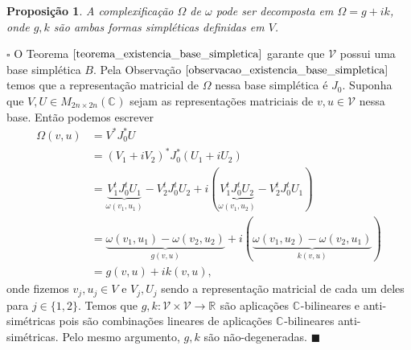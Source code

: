 \documentclass[12pt]{book}
\newtheorem{proposicao}[teorema]{Proposição}
\newenvironment{prova}[1]{$\square$ #1}{\hfill$\blacksquare$}
\newcommand{\complexificado}[1]{\mathcal{#1}}
\newcommand{\complexo}[1]{\mathbb{C}^{#1}}
\newcommand{\estruturacomplexa}{J_{0}}
\newcommand{\formaSimpletica}[2]{\omega(#1, #2)}
\newcommand{\formaSimpleticaExtendida}[2]{\Omega(#1, #2)}
\newcommand{\matrizquadcomplexa}[1]{M_{#1 \times #1}(\complexo{})}
\newcommand{\real}[1]{\mathbb{R}^{#1}}
\newcommand{\reta}{\real{}}
\begin{document}
	\begin{proposicao}
		A complexificação $\Omega$ de $\omega$ pode ser decomposta em $\Omega = g +i k$, onde $g,k$ são ambas formas simpléticas definidas em $V$.
	\end{proposicao}
	\begin{prova}
		
		O Teorema $\ref{teorema_existencia_base_simpletica}$ garante que $\complexificado{V}$ possui uma base simplética $B$. Pela Observação $\ref{observacao_existencia_base_simpletica}$ temos que a representação matricial de $\Omega$ nessa base simplética é $\estruturacomplexa$. Suponha que $V, U \in \matrizquadcomplexa{2n}$ sejam as representações matriciais de $v,u \in \complexificado{V}$ nessa base. Então podemos escrever $$
		\begin{aligned}
		\formaSimpleticaExtendida{v}{u} &= V^{*}\estruturacomplexa^{*} U 
		\\
		&= (V_{1}+iV_{2})^{*}\estruturacomplexa^{*} (U_{1}+iU_{2})
		\\
		&= \underbrace{V_{1}^{t}\estruturacomplexa^{t} U_{1}}_{\formaSimpletica{v_{1}}{u_{1}}} -V_{2}^{t}\estruturacomplexa^{t} U_{2}+i(\underbrace{ V_{1}^{t}\estruturacomplexa^{t} U_{2}}_{\formaSimpletica{v_{1}}{u_{2}}} - V_{2}^{t}\estruturacomplexa^{t} U_{1})
		\\
		&= \underbrace{\formaSimpletica{v_{1}}{u_{1}} -\formaSimpletica{v_{2}}{u_{2}}}_{g(v,u)}+i(\underbrace{ \formaSimpletica{v_{1}}{u_{2}}- \formaSimpletica{v_{2}}{u_{1}}}_{k(v,u)})
		\\
		&= g(v,u)+ik(v,u),
		\end{aligned}
		$$
		onde fizemos $v_{j}, u_{j}\in V$ e $V_{j}, U_{j}$ sendo a representação matricial de cada um deles para $j \in \{1,2\}$.
		Temos que $g,k:\complexificado{V}\times \complexificado{V} \to \reta$ são aplicações $\complexo{}$-bilineares e anti-simétricas pois são combinações lineares de aplicações $\complexo{}$-bilineares anti-simétricas. Pelo mesmo argumento, $g,k$ são não-degeneradas.
	\end{prova}
	
\end{document}
